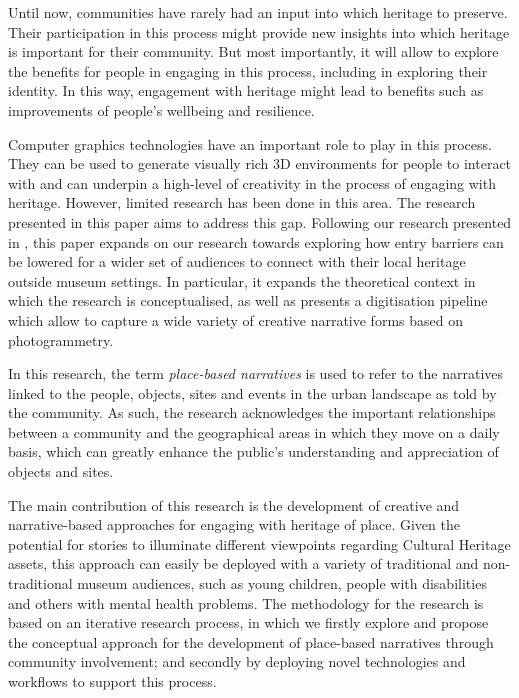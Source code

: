 \documentclass[acmlarge,screen,dvipsnames]{acmart}
\begin{document}

 Until now, communities have rarely had an input into which heritage to preserve.
Their participation in this process might provide new insights into which
heritage is important for their community. But most importantly, it will allow to explore the benefits for people in engaging in this process, including in exploring their identity. In this way, engagement with heritage might lead to benefits such as improvements of people's wellbeing and resilience. 


Computer graphics technologies have an important role to play in this process. They can be used to generate visually rich 3D environments for people to interact with and can underpin a high-level of creativity in the process of engaging with heritage. However, limited research has been done in this area.  The research presented in this paper aims to address this gap. Following our research presented in \cite{6b8314fd76a64d3f86fd627505cc29e9}, this paper expands on our research towards exploring how entry barriers can be lowered for a
wider set of audiences to connect with their local heritage outside museum
settings. In particular, it expands the theoretical context in which the research is conceptualised, as well as presents a digitisation pipeline which allow to capture a wide variety of creative narrative forms based on photogrammetry. 

In this research, the term \textit{place-based
narratives} is used to refer to the narratives linked to the
people, objects, sites and events in the urban landscape as told by the
community. As such, the research acknowledges the important relationships
between a community and the geographical areas in which they move on a daily basis, which
can greatly enhance the public's understanding and appreciation of objects and
sites. 

The main contribution of this research is the development of creative and narrative-based
approaches for engaging with heritage of place. Given the potential for stories to illuminate different viewpoints regarding Cultural Heritage assets, this approach can easily be deployed with a variety of traditional and non-traditional museum audiences, such as young children, people with disabilities and others with mental health problems. The methodology for the research is based on an iterative research process, in which we firstly explore and propose the conceptual approach for
the development of place-based narratives through community involvement; and
secondly by deploying novel technologies and workflows to support this process.
\end{document}
